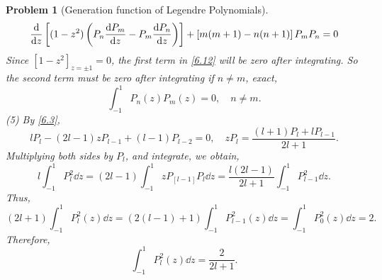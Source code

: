\documentclass{article}
\theoremstyle{1}
\newtheorem{problem}{Problem}
\begin{document}
\begin{problem}[Generation function of Legendre Polynomials]
\begin{equation}
        \dv{z} \left[ (1 - z^2) \left( P_n \dv{P_m}{z} - P_m \dv{P_n}{z} \right) \right] + \left[m(m+1) - n(n+1)\right] P_m P_n = 0
    \end{equation}
    Since $\left[1-z^2\right]_{z=\pm 1}=0$, the first term in \eqref{6.12} will be zero after integrating. So the second term must be zero after integrating if $n\not=m$, exact,
    \begin{equation}
        \int_{-1}^{1}P_n(z)P_m(z)=0,\quad n\not=m.
    \end{equation}
    (5) By \eqref{6.3}, 
    \begin{equation}
        lP_l-(2l-1)zP_{l-1}+(l-1)P_{l-2}=0,\quad zP_l=\frac{(l+1)P_l+lP_{l-1}}{2l+1}.
    \end{equation}
    Multiplying both sides by $P_l$, and integrate, we obtain,
    \begin{equation}
        l\int_{-1}^{1}P_l^2\dd{z}=(2l-1)\int_{-1}^{1}zP_[l-1]P_{l}\dd{z}=\frac{l(2l-1)}{2l+1}\int_{-1}^{1}P_{l-1}^2\dd{z}.
    \end{equation}
    Thus,
    \begin{equation}
        (2l+1)\int_{-1}^{1}P_l^2(z)\dd{z}=(2(l-1)+1)\int_{-1}^{1}P_{l-1}^2(z)\dd{z}=\int_{-1}^{1}P_0^2(z)\dd{z}=2.
    \end{equation}
    Therefore,
    \begin{equation}
        \int_{-1}^{1}P_{l}^2(z)\dd{z}=\frac{2}{2l+1}.
    \end{equation}
    
\end{problem}
\end{document}
